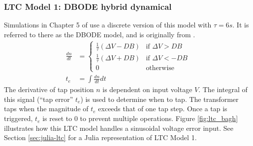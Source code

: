 \documentclass[10pt,letterpaper]{article}
\begin{document}
\subsubsection{LTC Model 1: DBODE hybrid dynamical}
Simulations in Chapter 5 of \cite{baghsorkhi2015} use a discrete version of this model with $\tau=6s$. It is referred to there as the DBODE model, and is originally from \cite{sauer1994}.
\begin{subequations}\label{eq:bagh-ltc}
\begin{align}
    \frac{dn}{dt} &=
    \begin{cases}
        \frac{1}{\tau}(\Delta V-DB) &\mbox{if }\Delta V > DB \\
        \frac{1}{\tau}(\Delta V+DB) &\mbox{if }\Delta V < -DB \\
        0 & \mbox{otherwise}
    \end{cases} \\
    t_e &= \int\frac{dn}{dt}dt
\end{align}
\end{subequations}
The derivative of tap position $n$ is dependent on input voltage $V$. The integral of this signal (``tap error'' $t_e$) is used to determine when to tap. The transformer taps when the magnitude of $t_e$ exceeds that of one tap step. Once a tap is triggered, $t_e$ is reset to 0 to prevent multiple operations. Figure \ref{fig:ltc_bagh} illustrates how this LTC model handles a sinusoidal voltage error input. See Section \ref{sec:julia-ltc} for a Julia representation of LTC Model 1.
\end{document}
